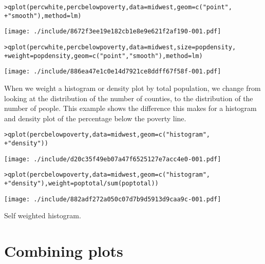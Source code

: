 \begin{alltt}
> qplot(percwhite, percbelowpoverty, data = midwest, geom = c("point", 
+     "smooth"), method = lm)
\end{alltt}
\texttt{[image: ./include/8672f3ee19e182cb1e8e9e621f2af190-001.pdf]}
\begin{alltt}

> qplot(percwhite, percbelowpoverty, data = midwest, size = popdensity, 
+     weight = popdensity, geom = c("point", "smooth"), method = lm)
\end{alltt}
\texttt{[image: ./include/886ea47e1c0e14d7921ce8ddff67f58f-001.pdf]}
\begin{alltt}

\end{alltt}

When we weight a histogram or density plot by total population, we change from looking at the distribution of the number of counties, to the distribution of the number of people.  This example shows the difference this makes for a histogram and density plot of the percentage below the poverty line.

\begin{alltt}
> qplot(percbelowpoverty, data = midwest, geom = c("histogram", 
+     "density"))
\end{alltt}
\texttt{[image: ./include/d20c35f49eb07a47f6525127e7acc4e0-001.pdf]}
\begin{alltt}

> qplot(percbelowpoverty, data = midwest, geom = c("histogram", 
+     "density"), weight = poptotal/sum(poptotal))
\end{alltt}
\texttt{[image: ./include/882adf272a050c07d7b9d5913d9caa9c-001.pdf]}
\begin{alltt}

\end{alltt}

Self weighted histogram.

\section{Combining plots}\label{sec:combining_plots}

